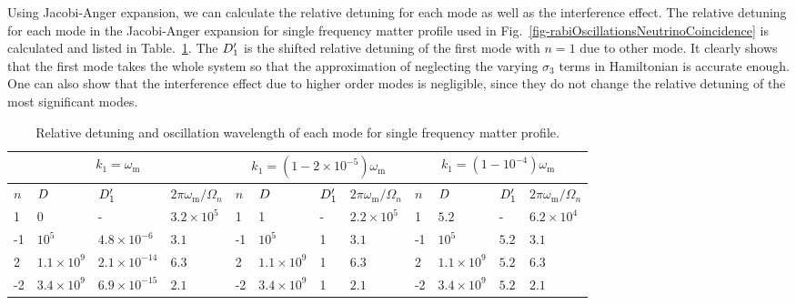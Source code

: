 Using Jacobi-Anger expansion, we can calculate the relative detuning for each mode as well as the interference effect. The relative detuning for each mode in the Jacobi-Anger expansion for single frequency matter profile used in Fig.~\ref{fig-rabiOscillationsNeutrinoCoincidence} is calculated and listed in Table.~\ref{tab-q-values-single-frequency-example}. The $D'_1$ is the shifted relative detuning of the first mode with $n=1$ due to other mode. It clearly shows that the first mode takes the whole system so that the approximation of neglecting the varying $\sigma_3$ terms in Hamiltonian is accurate enough. One can also show that the interference effect due to higher order modes is negligible, since they do not change the relative detuning of the most significant modes.






\begin{table}
\centering
\small
\setlength\tabcolsep{2pt}
\begin{tabular}{llll|llll|llll}
\hline
 \multicolumn{4}{c|}{$k_1=\omega_{\mathrm m}$} & \multicolumn{4}{c|}{$k_1=(1-2\times 10^{-5})\omega_{\mathrm{m}}$} & \multicolumn{4}{c}{$k_1=(1-10^{-4})\omega_{\mathrm m}$} \\
\hline
   $n$ & $D$ & $D'_1$  & $2\pi\omega_{\mathrm m}/\Omega_n$ & $n$ & $D$ & $D'_1$ & $2\pi\omega_{\mathrm m}/\Omega_n$ & $n$ & $D$ & $D'_1$ & $2\pi\omega_{\mathrm m}/\Omega_n$  \\
\hline
 1 &	0  & - &   $3.2\times10^5$   & 1 &	1 &  -  &   $2.2\times 10^5$       & 1   &	$5.2$ &  - & $6.2\times10^4$   \\
-1 &	$10^5$ &  $4.8\times 10^{-6}$  &   $3.1$     &     -1 &	$10^5$ &   1  &   $3.1$               &  -1 &	$10^5$  & $5.2$ & $3.1$  \\
2 &	$1.1\times 10^9$  &   $2.1\times 10^{-14}$  &   $6.3$    &  2 & 	$1.1\times 10^9$ &  1  &    $6.3$   &  2  &	$1.1\times 10^9$  &  $5.2$  & $6.3$  \\
-2 &	$3.4\times 10^9$  & $6.9\times 10^{-15}$ & $2.1$ &    -2 &	$3.4\times10^9$ &  1  &  $2.1$          & -2  &	$3.4\times 10^9$ & $5.2$ &  $2.1$  \\
\hline
\end{tabular}
\caption{\label{tab-q-values-single-frequency-example}Relative detuning and oscillation wavelength of each mode for single frequency matter profile.}
\end{table}




